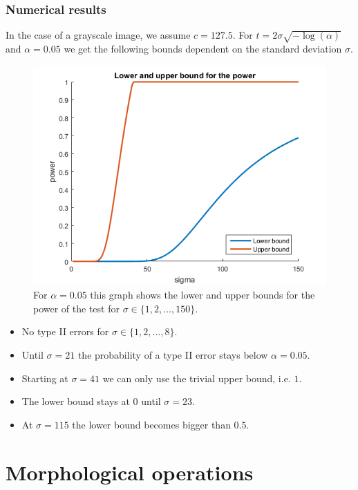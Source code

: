 \documentclass{beamer}
\begin{document}
\subsubsection{Numerical results}

\begin{frame}
	In the case of a grayscale image, we assume $c = 127.5$. For $t = 2 \sigma \sqrt{- \log(\alpha)}$ and $\alpha = 0.05$ we get the following bounds dependent on the standard deviation $\sigma$.
	
	\begin{figure}[h]
		\includegraphics[width=0.6\linewidth]{Testing/Power_Bounds}
		\caption[Power bounds]{For $\alpha = 0.05$ this graph shows the lower and upper bounds for the power of the test for $\sigma \in \{ 1, 2, \dots, 150 \}$.}
		\label{fig:powerbounds}
	\end{figure}
\end{frame}

\begin{frame}
	\begin{itemize}
		\item No type II errors for $\sigma \in \{ 1, 2, \dots, 8 \}$.
		\item Until $\sigma = 21$ the probability of a type II error stays below $\alpha = 0.05$.
		\item Starting at $\sigma = 41$ we can only use the trivial upper bound, i.e. $1$.
		\item The lower bound stays at $0$ until $\sigma = 23$.
		\item At $\sigma = 115$ the lower bound becomes bigger than $0.5$.
	\end{itemize}
\end{frame}

\section{Morphological operations}
\end{document}
